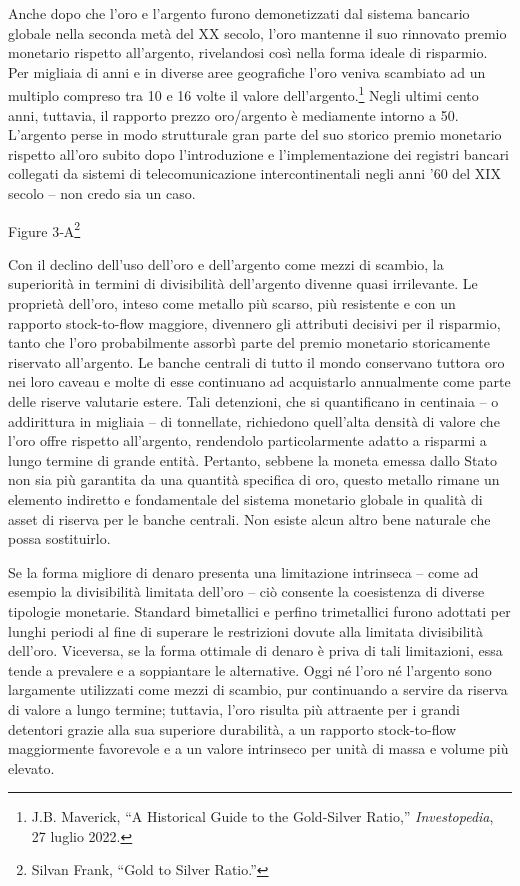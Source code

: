 \documentclass[
  a5paper,
  smalldemyvopaper,10pt,twoside,onecolumn,openright,extrafontsizes,hidelinks]{memoir}
\begin{document}
Anche dopo che l'oro e l'argento furono demonetizzati dal sistema
bancario globale nella seconda metà del XX secolo, l'oro mantenne il suo
rinnovato premio monetario rispetto all'argento, rivelandosi così nella
forma ideale di risparmio. Per migliaia di anni e in diverse aree
geografiche l'oro veniva scambiato ad un multiplo compreso tra 10 e 16
volte il valore dell'argento.\footnote{J.B. Maverick, ``A Historical
  Guide to the Gold-Silver Ratio,'' \emph{Investopedia}, 27 luglio 2022.}
Negli ultimi cento anni, tuttavia, il rapporto prezzo oro/argento è
mediamente intorno a 50. L'argento perse in modo strutturale gran parte
del suo storico premio monetario rispetto all'oro subito dopo
l'introduzione e l'implementazione dei registri bancari collegati da
sistemi di telecomunicazione intercontinentali negli anni '60 del XIX
secolo -- non credo sia un caso.

Figure 3‑A\footnote{Silvan Frank, ``Gold to Silver Ratio.''}

Con il declino dell'uso dell'oro e dell'argento come mezzi di scambio,
la superiorità in termini di divisibilità dell'argento divenne quasi
irrilevante. Le proprietà dell'oro, inteso come metallo più scarso, più
resistente e con un rapporto stock-to-flow maggiore, divennero gli
attributi decisivi per il risparmio, tanto che l'oro probabilmente
assorbì parte del premio monetario storicamente riservato all'argento.
Le banche centrali di tutto il mondo conservano tuttora oro nei loro
caveau e molte di esse continuano ad acquistarlo annualmente come parte
delle riserve valutarie estere. Tali detenzioni, che si quantificano in
centinaia -- o addirittura in migliaia -- di tonnellate, richiedono
quell'alta densità di valore che l'oro offre rispetto all'argento,
rendendolo particolarmente adatto a risparmi a lungo termine di grande
entità. Pertanto, sebbene la moneta emessa dallo Stato non sia più
garantita da una quantità specifica di oro, questo metallo rimane un
elemento indiretto e fondamentale del sistema monetario globale in
qualità di asset di riserva per le banche centrali. Non esiste alcun
altro bene naturale che possa sostituirlo.

Se la forma migliore di denaro presenta una limitazione intrinseca --
come ad esempio la divisibilità limitata dell'oro -- ciò consente la
coesistenza di diverse tipologie monetarie. Standard bimetallici e
perfino trimetallici furono adottati per lunghi periodi al fine di
superare le restrizioni dovute alla limitata divisibilità dell'oro.
Viceversa, se la forma ottimale di denaro è priva di tali limitazioni,
essa tende a prevalere e a soppiantare le alternative. Oggi né l'oro né
l'argento sono largamente utilizzati come mezzi di scambio, pur
continuando a servire da riserva di valore a lungo termine; tuttavia,
l'oro risulta più attraente per i grandi detentori grazie alla sua
superiore durabilità, a un rapporto stock-to-flow maggiormente
favorevole e a un valore intrinseco per unità di massa e volume più
elevato.
\end{document}
